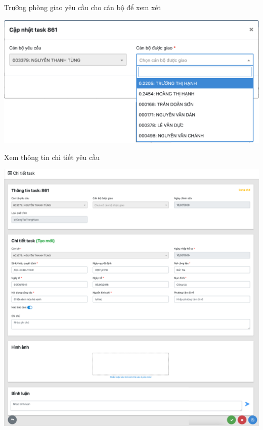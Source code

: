 \newpage Trưởng phòng giao yêu cầu cho cán bộ để xem xét
\begin{center}
  \captionsetup{type=figure}
  \includegraphics[width=15cm]{img/test/assignAdmin.png}
\end{center}
Xem thông tin chi tiết yêu cầu
\begin{center}
  \captionsetup{type=figure}
  \includegraphics[width=15cm]{img/test/taskDetailAdmin.png}
\end{center}


